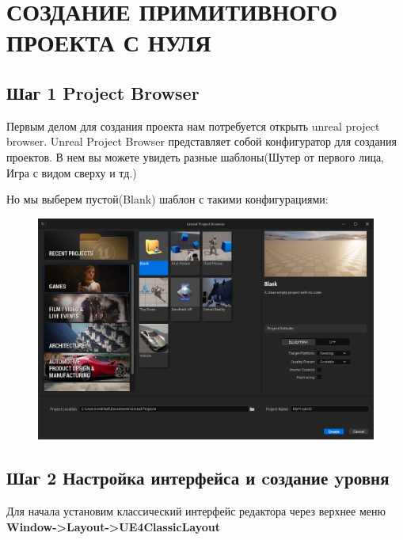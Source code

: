 \newpage
\section{СОЗДАНИЕ ПРИМИТИВНОГО ПРОЕКТА С НУЛЯ}

\subsection{Шаг 1 Project Browser}
Первым делом для создания проекта нам потребуется открыть unreal project browser.
Unreal Project Browser представляет собой конфигуратор для создания проектов.
В нем вы можете увидеть разные шаблоны(Шутер от первого лица, Игра с видом сверху и тд.)

Но мы выберем пустой(Blank) шаблон с такими конфигурациями:
\begin{figure}[h]
    \centering
    \includegraphics*[width = \textwidth]{Lections/ProjectBrowser.png}
\end{figure}

\subsection{Шаг 2 Настройка интерфейса и cоздание yровня}
Для начала установим классический интерфейс редактора через верхнее меню \textbf{Window->Layout->UE4ClassicLayout}

